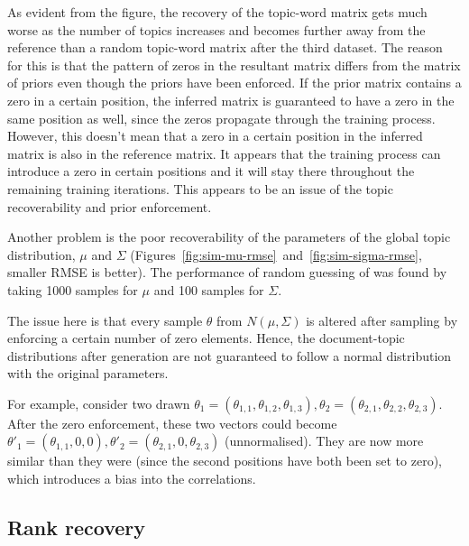 \documentclass[12pt,a4paper,twoside,openright]{report}
\begin{document}
As evident from the figure, the recovery of the topic-word matrix gets much worse as the number of topics increases and becomes further away from the reference than a random topic-word matrix after the third dataset. The reason for this is that the pattern of zeros in the resultant matrix differs from the matrix of priors even though the priors have been enforced. If the prior matrix contains a zero in a certain position, the inferred matrix is guaranteed to have a zero in the same position as well, since the zeros propagate through the training process. However, this doesn't mean that a zero in a certain position in the inferred matrix is also in the reference matrix. It appears that the training process can introduce a zero in certain positions and it will stay there throughout the remaining training iterations. This appears to be an issue of the topic recoverability and prior enforcement.

Another problem is the poor recoverability of the parameters of the global topic distribution, $\mu$ and $\Sigma$ (Figures~\ref{fig:sim-mu-rmse}~and~\ref{fig:sim-sigma-rmse}, smaller RMSE is better). The performance of random guessing of was found by taking 1000 samples for $\mu$ and 100 samples for $\Sigma$.

The issue here is that every sample $\theta$ from $N(\mu, \Sigma)$ is altered after sampling by enforcing a certain number of zero elements. Hence, the document-topic distributions after generation are not guaranteed to follow a normal distribution with the original parameters.

For example, consider two drawn $\theta_1 = (\theta_{1,1}, \theta_{1,2}, \theta_{1,3}), \theta_2 = (\theta_{2,1}, \theta_{2,2}, \theta_{2,3})$. After the zero enforcement, these two vectors could become $\theta'_1 = (\theta_{1,1}, 0, 0), \theta'_2 = (\theta_{2,1}, 0, \theta_{2,3})$ (unnormalised). They are now more similar than they were (since the second positions have both been set to zero), which introduces a bias into the correlations.

\subsection{Rank recovery}
\end{document}
